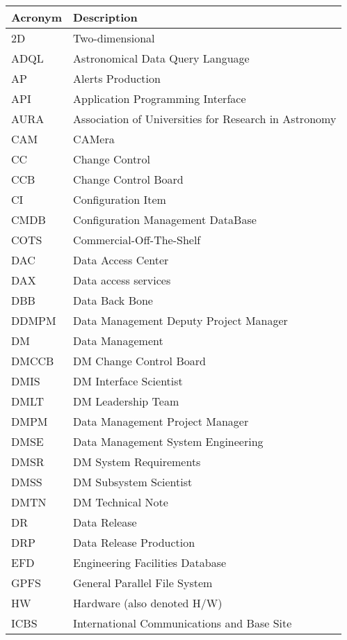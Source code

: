 \addtocounter{table}{-1}
\begin{longtable}{|l|p{}|}\hline
\textbf{Acronym} & \textbf{Description}  \\\hline

2D & Two-dimensional \\\hline
ADQL & Astronomical Data Query Language \\\hline
AP & Alerts Production \\\hline
API & Application Programming Interface \\\hline
AURA & Association of Universities for Research in Astronomy \\\hline
CAM & CAMera \\\hline
CC & Change Control \\\hline
CCB & Change Control Board \\\hline
CI & Configuration Item \\\hline
CMDB & Configuration Management DataBase \\\hline
COTS & Commercial-Off-The-Shelf \\\hline
DAC & Data Access Center \\\hline
DAX & Data access services \\\hline
DBB & Data Back Bone \\\hline
DDMPM & Data Management Deputy Project Manager \\\hline
DM & Data Management \\\hline
DMCCB & DM Change Control Board \\\hline
DMIS & DM Interface Scientist \\\hline
DMLT & DM Leadership Team \\\hline
DMPM & Data Management Project Manager \\\hline
DMSE & Data Management System Engineering \\\hline
DMSR & DM System Requirements \\\hline
DMSS & DM Subsystem Scientist \\\hline
DMTN & DM Technical Note \\\hline
DR & Data Release \\\hline
DRP & Data Release Production \\\hline
EFD & Engineering Facilities Database \\\hline
GPFS & General Parallel File System \\\hline
HW & Hardware (also denoted H/W) \\\hline
ICBS & International Communications and Base Site \\\hline

\end{longtable}
